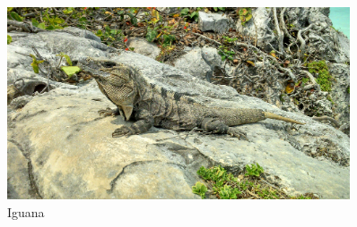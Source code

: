 \documentclass[11pt,twoside,openright,a6paper]{book}
\begin{document}
\begin{figure}[H]
  \centering
    \includegraphics[width=0.9\textwidth]{fotos/2013/iguana}
  \caption{Iguana}
  \label{Iguana}
\end{figure}
\end{document}
